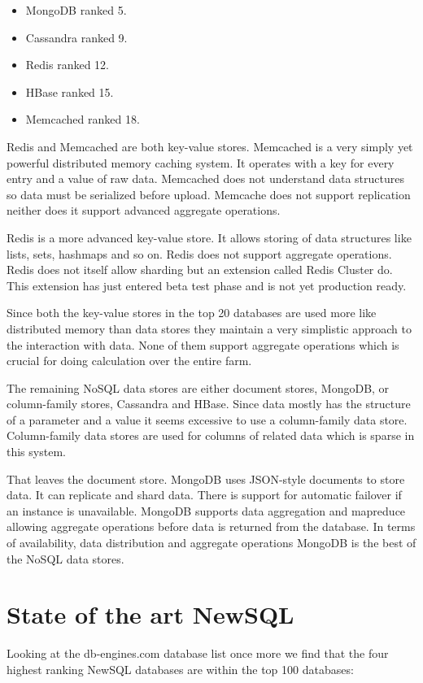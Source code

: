\begin{itemize}
\item MongoDB\cite{mongodb} ranked 5.
\item Cassandra\cite{cassandra} ranked 9.
\item Redis\cite{redis} ranked 12.
\item HBase\cite{hbase} ranked 15.
\item Memcached\cite{memcached} ranked 18.
\end{itemize}

Redis and Memcached are both key-value stores. Memcached is a very simply yet powerful distributed memory caching system.
It operates with a key for every entry and a value of raw data.
Memcached does not understand data structures so data must be serialized before upload.
Memcache does not support replication neither does it support advanced aggregate operations.

Redis is a more advanced key-value store.
It allows storing of data structures like lists, sets, hashmaps and so on.
Redis does not support aggregate operations.
Redis does not itself allow sharding but an extension called Redis Cluster do. This extension has just entered beta test phase and is not yet production ready.

Since both the key-value stores in the top 20 databases are used more like distributed memory than data stores they maintain a very simplistic approach to the interaction with data.
None of them support aggregate operations which is crucial for doing calculation over the entire farm.

The remaining NoSQL data stores are either document stores, MongoDB, or column-family stores, Cassandra and HBase.
Since data mostly has the structure of a parameter and a value it seems excessive to use a column-family data store. 
Column-family data stores are used for columns of related data which is sparse in this system.

That leaves the document store. MongoDB uses JSON-style documents to store data.
It can replicate and shard data. 
There is support for automatic failover if an instance is unavailable.
MongoDB supports data aggregation and mapreduce allowing aggregate operations before data is returned from the database.
In terms of availability, data distribution and aggregate operations MongoDB is the best of the NoSQL data stores.

\section{State of the art NewSQL}
Looking at the db-engines.com database list once more we find that the four highest ranking NewSQL databases are within the top 100 databases:

